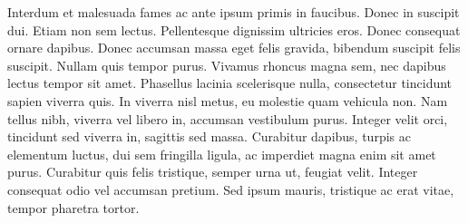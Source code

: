 \documentclass{tufte-handout}
\begin{document}
Interdum et malesuada fames ac ante ipsum primis in faucibus. Donec in suscipit dui. Etiam non sem lectus. Pellentesque dignissim ultricies eros. Donec consequat ornare dapibus. Donec accumsan massa eget felis gravida, bibendum suscipit felis suscipit. Nullam quis tempor purus. Vivamus rhoncus magna sem, nec dapibus lectus tempor sit amet. Phasellus lacinia scelerisque nulla, consectetur tincidunt sapien viverra quis. In viverra nisl metus, eu molestie quam vehicula non. Nam tellus nibh, viverra vel libero in, accumsan vestibulum purus. Integer velit orci, tincidunt sed viverra in, sagittis sed massa. Curabitur dapibus, turpis ac elementum luctus, dui sem fringilla ligula, ac imperdiet magna enim sit amet purus. Curabitur quis felis tristique, semper urna ut, feugiat velit. Integer consequat odio vel accumsan pretium. Sed ipsum mauris, tristique ac erat vitae, tempor pharetra tortor.
\end{document}
